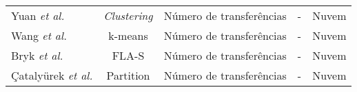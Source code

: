 \begin{table}[!ht]
{\begin{tabular}{|l |c |c |c |c |}
            Yuan \textit{et al.} \cite{Yuan2010}            & \textit{Clustering} & Número de transferências    & - &  Nuvem\\
            Wang \textit{et al.} \cite{Wang2014}           & k-means & Número de transferências &   -    &   Nuvem\\
            Bryk \textit{et al.} \cite{Bryk}               & FLA-S   & Número de transferências &   -    &   Nuvem\\
            Çatalyürek  \textit{et al.} \cite{Catal2011}   & Partition & Número de transferências & -    &   Nuvem\\ 
             \hline 
         \end{tabular}}
\end{table}



